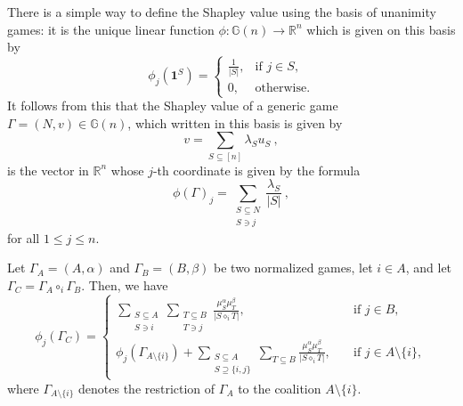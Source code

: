 \documentclass[a4paper,12pt]{amsart}
\begin{document}
\medskip

There is a simple way to define the Shapley value using the basis of unanimity games: it is the unique linear function $\phi: \mathbb{G}(n) \longrightarrow \mathbb{R}^n$ which is given on this basis by 
\[
\phi_j \left( \mathbf{1}^S \right) = \begin{cases}
        \frac{1}{ \lvert S \rvert }, & \text{if } j \in S, \\
        0, & \text{otherwise}. 
    \end{cases}
\]
It follows from this that the Shapley value of a generic game $\Gamma = (N, v) \in \mathbb{G}(n)$, which written in this basis is given by 
\[
v = \sum_{S \subseteq [n]} \lambda_S u_S~,
\]
is the vector in $\mathbb{R}^n$ whose $j$-th coordinate is given by the formula
\[
\phi(\Gamma)_j = \sum_{\substack{S \subseteq N \\ S \ni j}}  \frac{\lambda_S}{|S|}~,
\]
for all $1 \leq j \leq n$. 

\begin{proposition}\label{prop: shapley value of a composite game}
    Let \(\Gamma_A = (A, \alpha)\) and \(\Gamma_B = (B, \beta)\) be two normalized games, let \(i \in A\), and let \(\Gamma_C = \Gamma_A \circ_i \Gamma_B\). Then, we have 
    \[ 
    \phi_j \left( \Gamma_C \right) = \begin{cases}
        \displaystyle \sum_{\substack{S \subseteq A \\ S \ni i}} \sum_{\substack{T \subseteq B \\ T \ni j}} \frac{\mu^\alpha_S \mu^\beta_T}{\lvert S \diamond_i T \rvert}, & \quad \text{if } j \in B, \\
        \displaystyle \phi_j \left( \Gamma_{A \setminus \{i\}} \right) + \sum_{\substack{S \subseteq A \\ S \supseteq \{i, j\}}} \sum_{T \subseteq B} \frac{\mu^\alpha_S \mu^\beta_T}{\lvert S \diamond_i T \rvert}, & \quad \text{if } j \in A \setminus \{i\}, 
    \end{cases}
    \]
    where \(\Gamma_{A \setminus \{i\}}\) denotes the restriction of \(\Gamma_A\) to the coalition \(A \setminus \{i\}\). 
\end{proposition}
\end{document}

